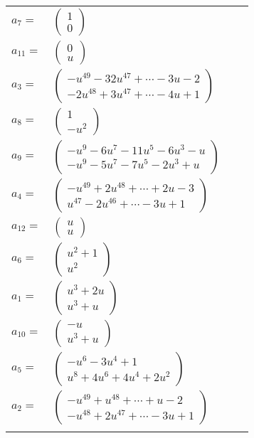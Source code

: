 \documentclass[1p]{elsarticle_modified}
\theoremstyle{definition}
\begin{document}
\begin{tabular}{m{7pt} m{180pt} m{7pt} m{180pt} }
\flushright $a_{7}=$&$\begin{pmatrix}1\\0\end{pmatrix}$ \\
\flushright $a_{11}=$&$\begin{pmatrix}0\\u\end{pmatrix}$ \\
\flushright $a_{3}=$&$\begin{pmatrix}- u^{49}-32 u^{47}+\cdots-3 u-2\\-2 u^{48}+3 u^{47}+\cdots-4 u+1\end{pmatrix}$ \\
\flushright $a_{8}=$&$\begin{pmatrix}1\\- u^2\end{pmatrix}$ \\
\flushright $a_{9}=$&$\begin{pmatrix}- u^9-6 u^7-11 u^5-6 u^3- u\\- u^9-5 u^7-7 u^5-2 u^3+u\end{pmatrix}$ \\
\flushright $a_{4}=$&$\begin{pmatrix}- u^{49}+2 u^{48}+\cdots+2 u-3\\u^{47}-2 u^{46}+\cdots-3 u+1\end{pmatrix}$ \\
\flushright $a_{12}=$&$\begin{pmatrix}u\\u\end{pmatrix}$ \\
\flushright $a_{6}=$&$\begin{pmatrix}u^2+1\\u^2\end{pmatrix}$ \\
\flushright $a_{1}=$&$\begin{pmatrix}u^3+2 u\\u^3+u\end{pmatrix}$ \\
\flushright $a_{10}=$&$\begin{pmatrix}- u\\u^3+u\end{pmatrix}$ \\
\flushright $a_{5}=$&$\begin{pmatrix}- u^6-3 u^4+1\\u^8+4 u^6+4 u^4+2 u^2\end{pmatrix}$ \\
\flushright $a_{2}=$&$\begin{pmatrix}- u^{49}+u^{48}+\cdots+u-2\\- u^{48}+2 u^{47}+\cdots-3 u+1\end{pmatrix}$\\&\end{tabular}
\end{document}
